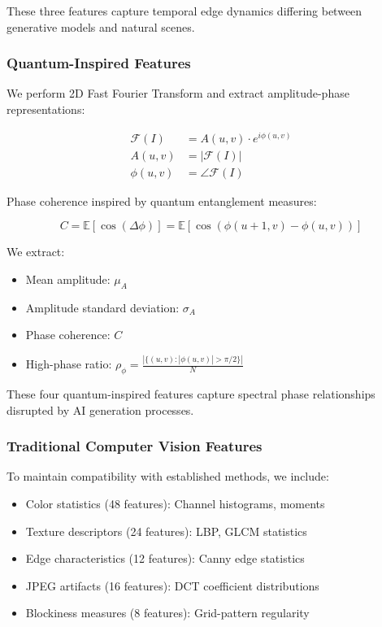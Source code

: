 \documentclass[runningheads]{llncs}
\begin{document}
These three features capture temporal edge dynamics differing between generative models and natural scenes.

\subsubsection{Quantum-Inspired Features}

We perform 2D Fast Fourier Transform and extract amplitude-phase representations:

\begin{align}
    \mathcal{F}(I) &= A(u,v) \cdot e^{i\phi(u,v)} \\
    A(u,v) &= |\mathcal{F}(I)| \\
    \phi(u,v) &= \angle \mathcal{F}(I)
\end{align}

Phase coherence inspired by quantum entanglement measures:

\begin{equation}
    C = \mathbb{E}[\cos(\Delta \phi)] = \mathbb{E}\left[\cos\left(\phi(u+1,v) - \phi(u,v)\right)\right]
\end{equation}

We extract:
\begin{itemize}
    \item Mean amplitude: $\mu_A$
    \item Amplitude standard deviation: $\sigma_A$
    \item Phase coherence: $C$
    \item High-phase ratio: $\rho_\phi = \frac{|\{(u,v) : |\phi(u,v)| > \pi/2\}|}{N}$
\end{itemize}

These four quantum-inspired features capture spectral phase relationships disrupted by AI generation processes.

\subsubsection{Traditional Computer Vision Features}

To maintain compatibility with established methods, we include:
\begin{itemize}
    \item Color statistics (48 features): Channel histograms, moments
    \item Texture descriptors (24 features): LBP, GLCM statistics
    \item Edge characteristics (12 features): Canny edge statistics
    \item JPEG artifacts (16 features): DCT coefficient distributions
    \item Blockiness measures (8 features): Grid-pattern regularity
\end{itemize}
\end{document}
